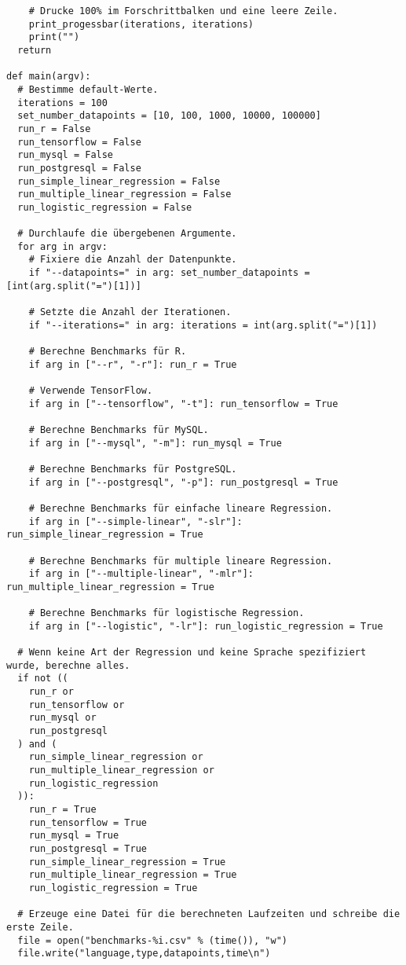 \begin{verbatim}
    # Drucke 100% im Forschrittbalken und eine leere Zeile.
    print_progessbar(iterations, iterations)
    print("")
  return

def main(argv):
  # Bestimme default-Werte.
  iterations = 100
  set_number_datapoints = [10, 100, 1000, 10000, 100000]
  run_r = False
  run_tensorflow = False
  run_mysql = False
  run_postgresql = False
  run_simple_linear_regression = False
  run_multiple_linear_regression = False
  run_logistic_regression = False

  # Durchlaufe die übergebenen Argumente.
  for arg in argv:
    # Fixiere die Anzahl der Datenpunkte.
    if "--datapoints=" in arg: set_number_datapoints = [int(arg.split("=")[1])]

    # Setzte die Anzahl der Iterationen.
    if "--iterations=" in arg: iterations = int(arg.split("=")[1])

    # Berechne Benchmarks für R.
    if arg in ["--r", "-r"]: run_r = True

    # Verwende TensorFlow.
    if arg in ["--tensorflow", "-t"]: run_tensorflow = True

    # Berechne Benchmarks für MySQL.
    if arg in ["--mysql", "-m"]: run_mysql = True

    # Berechne Benchmarks für PostgreSQL.
    if arg in ["--postgresql", "-p"]: run_postgresql = True

    # Berechne Benchmarks für einfache lineare Regression.
    if arg in ["--simple-linear", "-slr"]: run_simple_linear_regression = True

    # Berechne Benchmarks für multiple lineare Regression.
    if arg in ["--multiple-linear", "-mlr"]: run_multiple_linear_regression = True

    # Berechne Benchmarks für logistische Regression.
    if arg in ["--logistic", "-lr"]: run_logistic_regression = True

  # Wenn keine Art der Regression und keine Sprache spezifiziert wurde, berechne alles.
  if not ((
    run_r or
    run_tensorflow or
    run_mysql or
    run_postgresql
  ) and (
    run_simple_linear_regression or
    run_multiple_linear_regression or
    run_logistic_regression
  )):
    run_r = True
    run_tensorflow = True
    run_mysql = True
    run_postgresql = True
    run_simple_linear_regression = True
    run_multiple_linear_regression = True
    run_logistic_regression = True

  # Erzeuge eine Datei für die berechneten Laufzeiten und schreibe die erste Zeile.
  file = open("benchmarks-%i.csv" % (time()), "w")
  file.write("language,type,datapoints,time\n")


\end{verbatim}
